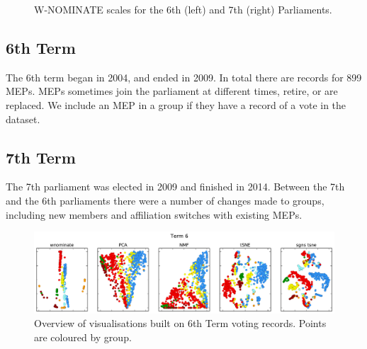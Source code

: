\documentclass{llncs}
\begin{document}
\begin{figure}[!h]
\begin{minipage}{0.5\textwidth}
    \end{minipage}
    \caption{W-NOMINATE scales for the 6th (left) and 7th (right) Parliaments.}\label{fig:wn}
\end{figure}


\subsection{6th Term}

The 6th term began in 2004, and ended in 2009. In total there are records for 899 MEPs. MEPs sometimes join the parliament at different times, retire, or are replaced. We include an MEP in a group if they have a record of a vote in the dataset.


\subsection{7th Term}

The 7th parliament was elected in 2009 and finished in 2014. Between the 7th and the 6th parliaments there were a number of changes made to groups, including new members and affiliation switches with existing MEPs.



\begin{figure}[!h]
\includegraphics[width=\textwidth]{figures/term6.pdf}
\caption{Overview of visualisations built on 6th Term voting records. Points are coloured by group.}
\label{fig:allmethods6}
\end{figure}
\end{document}

